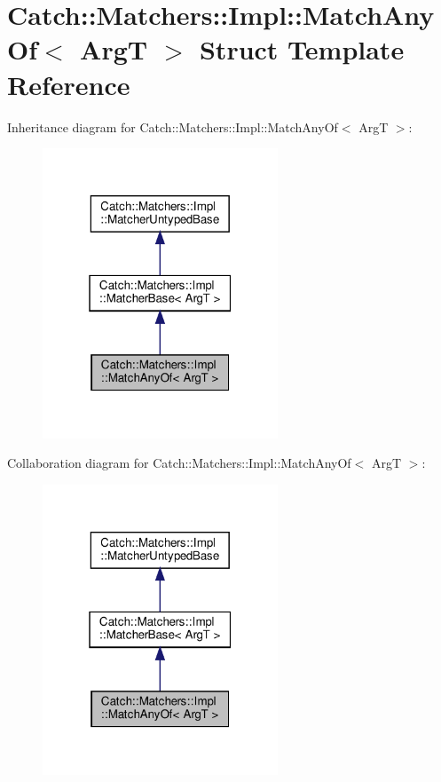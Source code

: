 \hypertarget{structCatch_1_1Matchers_1_1Impl_1_1MatchAnyOf}{}\section{Catch\+:\+:Matchers\+:\+:Impl\+:\+:Match\+Any\+Of$<$ ArgT $>$ Struct Template Reference}
\label{structCatch_1_1Matchers_1_1Impl_1_1MatchAnyOf}


Inheritance diagram for Catch\+:\+:Matchers\+:\+:Impl\+:\+:Match\+Any\+Of$<$ ArgT $>$\+:\nopagebreak
\begin{figure}[H]
\begin{center}
\leavevmode
\includegraphics[width=199pt]{structCatch_1_1Matchers_1_1Impl_1_1MatchAnyOf__inherit__graph}
\end{center}
\end{figure}


Collaboration diagram for Catch\+:\+:Matchers\+:\+:Impl\+:\+:Match\+Any\+Of$<$ ArgT $>$\+:\nopagebreak
\begin{figure}[H]
\begin{center}
\leavevmode
\includegraphics[width=199pt]{structCatch_1_1Matchers_1_1Impl_1_1MatchAnyOf__coll__graph}
\end{center}
\end{figure}
